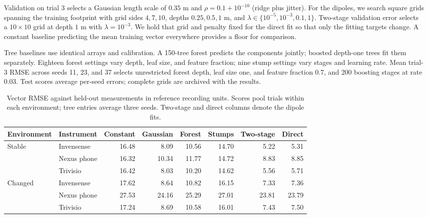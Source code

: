 \documentclass[11pt]{article}
\begin{document}
Validation on trial 3 selects a Gaussian length scale of \(0.35\) m and
\(\rho=0.1+10^{-10}\) (ridge plus jitter). For the dipoles, we search square
grids spanning the training footprint with grid sides \(4,7,10\), depths
\(0.25,0.5,1\) m, and \(\lambda\in\{10^{-5},10^{-3},0.1,1\}\). Two-stage
validation error selects a \(10\times10\) grid at depth \(1\) m with
\(\lambda=10^{-3}\). We hold that grid and penalty fixed for the direct fit so
that only the fitting targets change. A constant baseline predicting the mean
training vector everywhere provides a floor for comparison.

Tree baselines use identical arrays and calibration. A 150-tree forest predicts
the components jointly; boosted depth-one trees fit them separately. Eighteen
forest settings vary depth, leaf size, and feature fraction; nine stump settings
vary stages and learning rate. Mean trial-3 RMSE across seeds 11, 23, and 37
selects unrestricted forest depth, leaf size one, and feature fraction 0.7,
and 200 boosting stages at rate 0.03. Test scores average per-seed errors;
complete grids are archived with the results.

\begin{table}[!htbp]
\centering
\caption{Vector RMSE against held-out measurements in reference recording
units. Scores pool trials within each environment; tree entries average three
seeds. Two-stage and direct columns denote the dipole fits.}
\label{tab:mag}
\small
\begin{tabular}{@{}llrrrrrr@{}}
\toprule
Environment & Instrument & Constant & Gaussian & Forest & Stumps & Two-stage & Direct \\
\midrule
Stable & Invensense  & 16.48 &  8.09 & 10.56 & 14.70 &  5.22 &  5.31 \\
       & Nexus phone & 16.32 & 10.34 & 11.77 & 14.72 &  8.83 &  8.85 \\
       & Trivisio    & 16.42 &  8.03 & 10.20 & 14.62 &  5.56 &  5.71 \\
\addlinespace
Changed & Invensense  & 17.62 &  8.64 & 10.82 & 16.15 &  7.33 &  7.36 \\
        & Nexus phone & 27.53 & 24.16 & 25.29 & 27.01 & 23.81 & 23.79 \\
        & Trivisio    & 17.24 &  8.69 & 10.58 & 16.01 &  7.43 &  7.50 \\
\bottomrule
\end{tabular}
\end{table}
\end{document}
